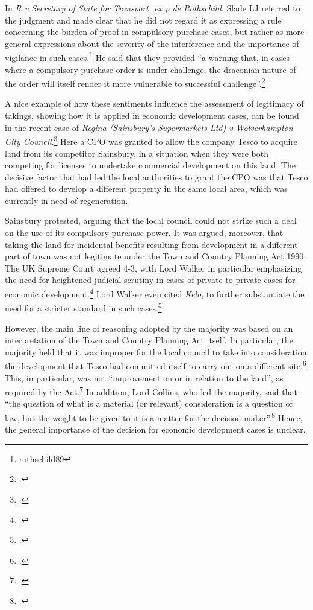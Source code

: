 \documentclass[12pt,a4paper]{book} %
\begin{document}
In {\it R v Secretary of State for Transport, ex p de Rothschild}, Slade LJ referred to the judgment and made clear that he did not regard it as expressing a rule concerning the burden of proof in compulsory purchase cases, but rather as more general expressions about the severity of the interference and the importance of vigilance in such cases.\footnote{rothschild89} He said that they provided ``a warning that, in cases where a compulsory purchase order is under challenge, the draconian nature of the order will itself render it more vulnerable to successful challenge''.\footcite[938]{rothschild89}

A nice example of how these sentiments influence the assessment of legitimacy of takings, showing how it is applied in economic development cases, can be found in the recent case of {\it Regina (Sainsbury’s Supermarkets Ltd) v Wolverhampton City Council}.\footcite{sainsbury10} Here a CPO was granted to allow the company Tesco to acquire land from its competitor Sainsbury, in a situation when they were both competing for licenses to undertake commercial development on this land. The decisive factor that had led the local authorities to grant the CPO was that Tesco had offered to develop a different property in the same local area, which was currently in need of regeneration. 

Sainsbury protested, arguing that the local council could not strike such a deal on the use of its compulsory purchase power. It was argued, moreover, that taking the land for incidental benefits resulting from development in a different part of town was not legitimate under the Town and Country Planning Act 1990. The UK Supreme Court agreed 4-3, with Lord Walker in particular emphasizing the need for heightened judicial scrutiny in cases of private-to-private cases for economic development.\footcite[80-84]{sainsbury10} Lord Walker even cited {\it Kelo}, to further substantiate the need for a stricter standard in such cases.\footcite[81]{sainsbury10} 

However, the main line of reasoning adopted by the majority was based on an interpretation of the Town and Country Planning Act itself. In particular, the majority held that it was improper for the local council to take into consideration the development that Tesco had committed itself to carry out on a different site.\footcite[73-79]{sainsbury10} This, in particular, was not ``improvement on or in relation to the land'', as required by the Act.\footcite[336]{tcpa90} In addition, Lord Collins, who led the majority, said that ``the question of what is a material (or relevant) consideration is a question of law, but the weight to be given to it is a matter for the decision maker''.\footcite[70]{sainsbury10} Hence, the general importance of the decision for economic development cases is unclear.
\end{document}
